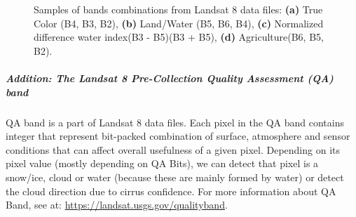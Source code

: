 \begin{figure}[h!]
\centering
{} 
\centering
\caption{Samples of bands combinations from Landsat 8 data files:
\textbf{(a)} True Color (B4, B3, B2), \textbf{(b)} Land/Water (B5, B6, B4), \textbf{(c)} Normalized difference water index(B3 - B5)(B3 + B5), \textbf{(d)} Agriculture(B6, B5, B2).}
\end{figure}

\subparagraph{Addition: The Landsat 8 Pre-Collection Quality Assessment (QA) band}

QA band is a part of Landsat 8 data files. Each pixel in the QA band contains integer that represent bit-packed combination of surface, atmosphere and sensor conditions that can affect overall usefulness of a given pixel. Depending on its pixel value (mostly depending on QA Bits), we can detect that pixel is a snow/ice, cloud or water (because these are mainly formed by water) or detect the cloud direction due to cirrus confidence. For more information about QA Band, see at: \href{https://landsat.usgs.gov/qualityband}{https://landsat.usgs.gov/qualityband}.

